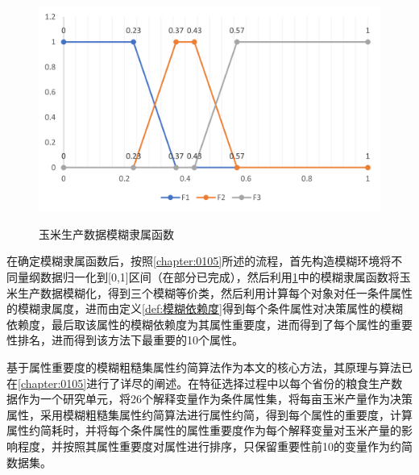 \begin{figure}[htbp]
      \centering
      \resizebox{\textwidth}{!}
      {
      \includegraphics{figs/membership_foodsecurity.png}
      }
      \caption{玉米生产数据模糊隶属函数}
      \label{fig:membership_foodsecurity}
\end{figure}

在确定模糊隶属函数后，按照\ref{chapter:0105}所述的流程，首先构造模糊环境将不同量纲数据归一化到[0,1]区间（在部分已完成），然后利用\ref{fig:membership_foodsecurity}中的模糊隶属函数将玉米生产数据模糊化，得到三个模糊等价类，然后利用计算每个对象对任一条件属性的模糊隶属度，进而由定义\ref{def:模糊依赖度}得到每个条件属性对决策属性的模糊依赖度，最后取该属性的模糊依赖度为其属性重要度，进而得到了每个属性的重要性排名，进而得到该方法下最重要的10个属性。

基于属性重要度的模糊粗糙集属性约简算法作为本文的核心方法，其原理与算法已在\ref{chapter:0105}进行了详尽的阐述。在特征选择过程中以每个省份的粮食生产数据作为一个研究单元，将26个解释变量作为条件属性集，将每亩玉米产量作为决策属性，采用模糊粗糙集属性约简算法进行属性约简，得到每个属性的重要度，计算属性约简耗时，并将每个条件属性的属性重要度作为每个解释变量对玉米产量的影响程度，并按照其属性重要度对属性进行排序，只保留重要性前10的变量作为约简数据集。



